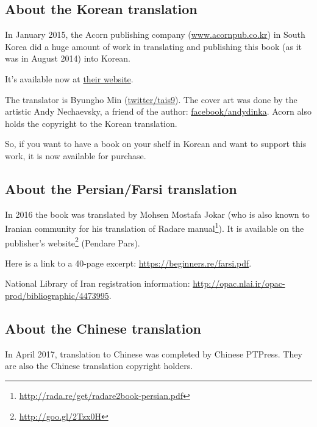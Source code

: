 \subsection*{About the Korean translation}

In January 2015, the Acorn publishing company (\href{http://www.acornpub.co.kr}{www.acornpub.co.kr}) in South Korea did a huge amount of work in translating and publishing
this book (as it was in August 2014) into Korean.

It's available now at \href{http://go.yurichev.com/17343}{their website}.

\iffalse
\begin{figure}[H]
\centering
\texttt{[image: acorn\_cover.jpg]}
\end{figure}
\fi

The translator is Byungho Min (\href{http://go.yurichev.com/17344}{twitter/tais9}).
The cover art was done by the artistic Andy Nechaevsky, a friend of the author:
\href{http://go.yurichev.com/17023}{facebook/andydinka}.
Acorn also holds the copyright to the Korean translation.

So, if you want to have a  book on your shelf in Korean and
want to support this work, it is now available for purchase.

\subsection*{About the Persian/Farsi translation}

In 2016 the book was translated by Mohsen Mostafa Jokar (who is also known to Iranian community for his translation of Radare manual\footnote{\url{http://rada.re/get/radare2book-persian.pdf}}).
It is available on the publisher’s website\footnote{\url{http://goo.gl/2Tzx0H}} (Pendare Pars).

Here is a link to a 40-page excerpt: \url{https://beginners.re/farsi.pdf}.

National Library of Iran registration information: \url{http://opac.nlai.ir/opac-prod/bibliographic/4473995}.

\subsection*{About the Chinese translation}

In April 2017, translation to Chinese was completed by Chinese PTPress. They are also the Chinese translation copyright holders.

